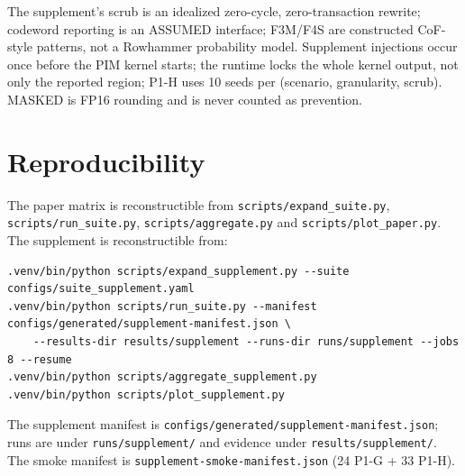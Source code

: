 \documentclass[10pt]{article}
\begin{document}
The supplement's scrub is an idealized zero-cycle, zero-transaction rewrite;
codeword reporting is an ASSUMED interface; F3M/F4S are constructed CoF-style
patterns, not a Rowhammer probability model. Supplement injections occur once
before the PIM kernel starts; the runtime locks the whole kernel output, not
only the reported region; P1-H uses 10 seeds per (scenario, granularity,
scrub). MASKED is FP16 rounding and is never counted as prevention.

\section{Reproducibility}
The paper matrix is reconstructible from \texttt{scripts/expand\_suite.py},
\texttt{scripts/run\_suite.py}, \texttt{scripts/aggregate.py} and
\texttt{scripts/plot\_paper.py}. The supplement is reconstructible from:

\begin{verbatim}
.venv/bin/python scripts/expand_supplement.py --suite configs/suite_supplement.yaml
.venv/bin/python scripts/run_suite.py --manifest configs/generated/supplement-manifest.json \
    --results-dir results/supplement --runs-dir runs/supplement --jobs 8 --resume
.venv/bin/python scripts/aggregate_supplement.py
.venv/bin/python scripts/plot_supplement.py
\end{verbatim}

The supplement manifest is
\texttt{configs/generated/supplement-manifest.json}; runs are under
\texttt{runs/supplement/} and evidence under \texttt{results/supplement/}.
The smoke manifest is \texttt{supplement-smoke-manifest.json} (24 P1-G +
33 P1-H).



\end{document}
